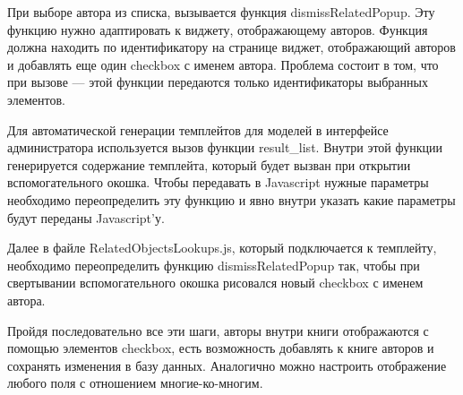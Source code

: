 При выборе автора из списка, вызывается функция dismissRelatedPopup. Эту функцию нужно адаптировать к виджету, отображающему авторов. Функция должна находить по идентификатору на странице виджет, отображающий авторов и добавлять еще один checkbox с именем автора. Проблема состоит в том, что при вызове --- этой функции передаются только идентификаторы выбранных элементов.

Для автоматической генерации темплейтов для моделей в интерфейсе администратора используется вызов функции result\_list. Внутри этой функции генерируется содержание темплейта, который будет вызван при открытии вспомогательного окошка. Чтобы передавать в Javascript нужные параметры необходимо переопределить эту функцию и явно внутри указать какие параметры будут переданы Javascript'у.

Далее в файле RelatedObjectsLookups.js, который подключается к темплейту, необходимо переопределить функцию dismissRelatedPopup так, чтобы при свертывании вспомогательного окошка рисовался новый checkbox с именем автора. 

Пройдя последовательно все эти шаги, авторы внутри книги отображаются с помощью элементов checkbox, есть возможность добавлять к книге авторов и сохранять изменения в базу данных. Аналогично можно настроить отображение любого поля с отношением многие-ко-многим.

\newpage
